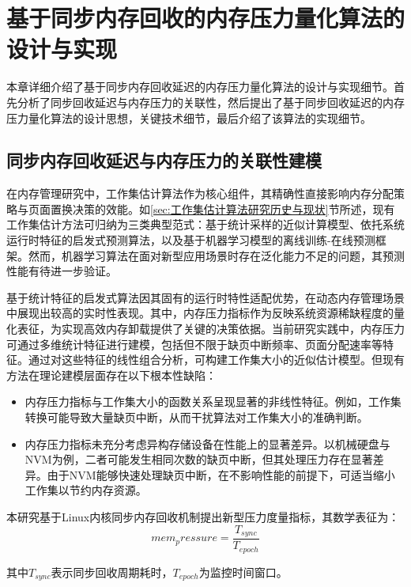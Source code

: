 \chapter{基于同步内存回收的内存压力量化算法的设计与实现}
\label{chap:基于同步内存回收的内存压力量化算法的设计与实现}
本章详细介绍了基于同步内存回收延迟的内存压力量化算法的设计与实现细节。首先分析了同步回收延迟与内存压力的关联性，然后提出了基于同步回收延迟的内存压力量化算法的设计思想，关键技术细节，最后介绍了该算法的实现细节。

\section{同步内存回收延迟与内存压力的关联性建模}

在内存管理研究中，工作集估计算法作为核心组件，其精确性直接影响内存分配策略与页面置换决策的效能。如\ref{sec:工作集估计算法研究历史与现状}节所述，现有工作集估计方法可归纳为三类典型范式：基于统计采样的近似计算模型、依托系统运行时特征的启发式预测算法，以及基于机器学习模型的离线训练-在线预测框架。然而，机器学习算法在面对新型应用场景时存在泛化能力不足的问题，其预测性能有待进一步验证。

基于统计特征的启发式算法因其固有的运行时特性适配优势，在动态内存管理场景中展现出较高的实时性表现。其中，内存压力指标作为反映系统资源稀缺程度的量化表征，为实现高效内存卸载提供了关键的决策依据。当前研究实践中，内存压力可通过多维统计特征进行建模，包括但不限于缺页中断频率、页面分配速率等特征。通过对这些特征的线性组合分析，可构建工作集大小的近似估计模型。但现有方法在理论建模层面存在以下根本性缺陷：

\begin{itemize}
    \item 内存压力指标与工作集大小的函数关系呈现显著的非线性特征。例如，工作集转换可能导致大量缺页中断，从而干扰算法对工作集大小的准确判断。
    \item 内存压力指标未充分考虑异构存储设备在性能上的显著差异。以机械硬盘与NVM为例，二者可能发生相同次数的缺页中断，但其处理压力存在显著差异。由于NVM能够快速处理缺页中断，在不影响性能的前提下，可适当缩小工作集以节约内存资源。
\end{itemize}

本研究基于Linux内核同步内存回收机制提出新型压力度量指标，其数学表征为：
\begin{equation}
    \label{eq:mem_pressure}
    mem_pressure = \frac{T_{sync}}{T_{epoch}}
\end{equation}

其中\(T_{sync}\)表示同步回收周期耗时，\(T_{epoch}\)为监控时间窗口。

